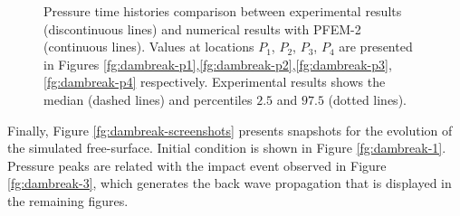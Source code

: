 \begin{figure}[h]
{    }
   \caption{Pressure time histories comparison between experimental results\cite{Lobovsky13} (discontinuous lines) and numerical results with PFEM-2 (continuous lines). Values at locations $P_1$, $P_2$, $P_3$, $P_4$ are presented in Figures \ref{fg:dambreak-p1},\ref{fg:dambreak-p2},\ref{fg:dambreak-p3},\ref{fg:dambreak-p4} respectively. Experimental results shows the median (dashed lines) and percentiles $2.5$ and $97.5$ (dotted lines).}
   \label{fg:dambreak-p}                %
\end{figure}

Finally, Figure \ref{fg:dambreak-screenshots} presents snapshots for the evolution of the simulated free-surface. Initial condition is shown in Figure \ref{fg:dambreak-1}. Pressure peaks are related with the impact event observed in Figure \ref{fg:dambreak-3}, which generates the back wave propagation that is displayed in the remaining figures.
